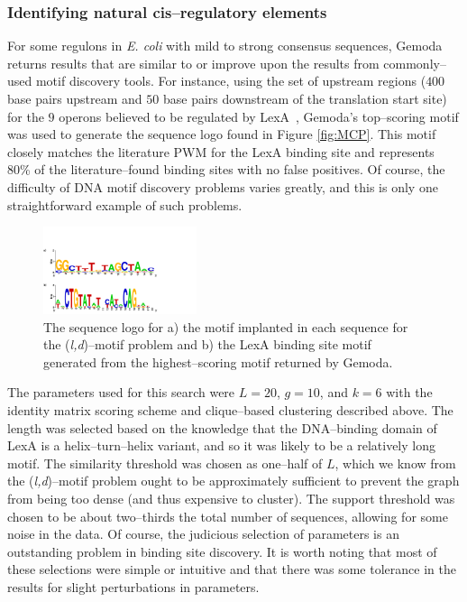     \subsubsection{Identifying natural cis--regulatory elements}
    For some regulons in \textit{E. coli} with mild
    to strong consensus sequences, Gemoda returns
    results that are similar to or improve upon the
    results from commonly--used motif discovery tools.
    For instance, using the set of upstream regions
    ($400$ base pairs upstream and $50$ base pairs
    downstream of the translation start site) for
    the $9$ operons believed to be regulated by
    LexA~\citep{salgado2004regulondb}, Gemoda's
    top--scoring motif was used to generate the
    sequence logo found in Figure \vref{fig:MCP}.
    This motif closely matches the literature PWM
    for the LexA binding site and represents 80\%
    of the literature--found binding sites with no
    false positives.  Of course, the difficulty of DNA motif
    discovery problems varies greatly, and this is only one
    straightforward example of such problems.

    \begin{figure}[ptb]
        \centering
        \includegraphics[width=0.40\textwidth]{Body/Images-chap3/gemoda_fig3.pdf}
        \caption{The sequence logo for a) the motif implanted in each
            sequence for the (\textit{l,d})--motif problem and b) the
        LexA binding site motif generated from the highest--scoring
        motif returned by Gemoda.}\label{fig:MCP}
    \end{figure}

    The parameters used for this search were $L = 20$, $g = 10$, and
    $k = 6$ with the identity matrix scoring scheme
    and clique--based clustering described above.
    The length was selected based on the knowledge
    that the DNA--binding domain of LexA is a
    helix--turn--helix variant, and so it was likely
    to be a relatively long motif.  The similarity
    threshold was chosen as one--half of $L$, which
    we know from the (\textit{l,d})--motif problem
    ought to be approximately sufficient to prevent
    the graph from being too dense (and thus expensive
    to cluster).  The support threshold was chosen to
    be about two--thirds the total number of sequences,
    allowing for some noise in the data.  Of course,
    the judicious selection of parameters is an
    outstanding problem in binding site discovery.
    It is worth noting that most of these selections
    were simple or intuitive and that there was some tolerance
    in the results for slight perturbations in parameters.

